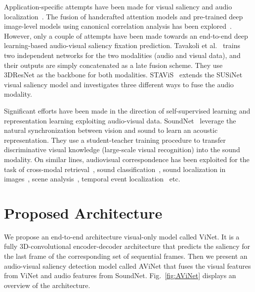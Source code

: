 \documentclass[letterpaper, 10 pt, conference]{ieeeconf}  \usepackage{times}
\begin{document}
Application-specific attempts have been made for visual saliency and audio localization~\cite{ruesch2008multimodal,schauerte2011multimodal,chen2014audio}. The fusion of handcrafted attention models and pre-trained deep image-level models using canonical correlation analysis has been explored~\cite{min2016fixation,min2020multimodal}. However, only a couple of attempts have been made towards an end-to-end deep learning-based audio-visual saliency fixation prediction. Tavakoli et al.~\cite{tavakoli2019dave} trains two independent networks for the two modalities (audio and visual data), and their outputs are simply concatenated as a late fusion scheme. They use 3DResNet as the backbone for both modalities. STAViS~\cite{tsiami2020stavis} extends the SUSiNet~\cite{koutras2019susinet} visual saliency model and investigates three different ways to fuse the audio modality.  

Significant efforts have been made in the direction of self-supervised learning and representation learning exploiting audio-visual data. SoundNet~\cite{aytar2016soundnet} leverage the natural synchronization between vision and sound to learn an acoustic representation. They use a student-teacher training procedure to transfer discriminative visual knowledge (large-scale visual recognition) into the sound modality. On similar lines, audiovisual correspondence has been exploited for the task of cross-modal retrieval~\cite{arandjelovic2018objects}, sound classification~\cite{aytar2016soundnet, arandjelovic2017look}, sound localization in images~\cite{arandjelovic2018objects, senocak2018learning}, scene analysis~\cite{owens2018audio}, temporal event localization~\cite{tian2018audio} etc.











\section{Proposed Architecture}

We propose an end-to-end architecture visual-only model called ViNet. It is a fully 3D-convolutional encoder-decoder architecture that predicts the saliency for the last frame of the corresponding set of sequential frames. Then we present an audio-visual saliency detection model called AViNet that fuses the visual features from ViNet and audio features from SoundNet. Fig.~\ref{fig:AViNet} displays an overview of the architecture. 
\end{document}

